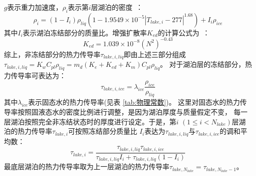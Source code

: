 $g$表示重力加速度，$\rho_i$表示第$i$层湖泊的密度~\citep{hostetler1990simulation}：
\begin{equation}\label{rho_i}
\rho_{i}=\left(1-I_{i}\right) \rho_{liq}\left(1-1.9549 \times 10^{-5}\left|T_{lake, i}-277\right|^{1.68}\right)+I_{i} \rho_{ice}
\end{equation}
其中$I_i$表示湖泊冻结部分的质量比。增强扩散率$K_{ed}$的计算公式为~\citep{fang1996long}：
\begin{equation}
K_{e d}=1.039 \times 10^{-8}\left(N^{2}\right)^{-0.43}
\end{equation}
综上，非冻结部分的热力传导率$\tau_{lake,i,liq}$即由上述三部分组成
$\tau_{lake,i,liq}=K_wC_{pl}\rho_{liq}=m_d\left(K_e+K_{ed}+K_m\right)C_{pl}\rho_{liq}$。
对于湖泊层的冻结部分，热力传导率可表达为：
\begin{equation}
\tau_{lake,i,ice}=\lambda_{ice} \frac{\rho_{ice}}{\rho_{liq}}
\end{equation}
其中$\lambda_{ice}$表示固态水的热力传导率(见表 \ref{tab:物理常数})。
这里对固态水的热力传导率按照固液态水的密度比例进行调整，是因为湖泊厚度与质量假定不变，
每一层湖泊按照完全非冻结状态时的厚度进行设定。于是，第$i$ $\left(1\leqslant i<N_{lake}\right)$层湖泊的热力传导率$\tau_{lake,i}$可按照冻结部分质量比
$I_i$表达为$\tau_{lake,i,liq}$与$\tau_{lake,i,ice}$的调和平均数：
\begin{equation}
\tau_{lake, i}=\frac{\tau_{lake, i, liq} \tau_{lake, i, ice}}{\tau_{lake, i, liq} I_{i}+\tau_{lake, i, liq}\left(1-I_{i}\right)}
\end{equation}
最底层湖泊的热力传导率取为上一层湖泊的热力传导率$\tau_{lake,N_{lake}}=\tau_{lake,N_{lake}-1}$。 


